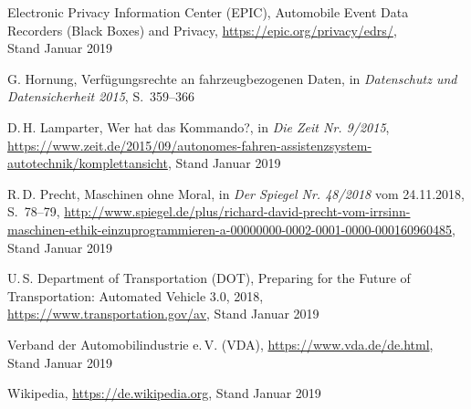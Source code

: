 \documentclass[twoside,a4paper,12pt]{article}
\begin{document}
\begin{thebibliography}{99}
 Electronic Privacy Information Center (EPIC), Automobile Event Data Recorders (Black Boxes) and Privacy,
\url{https://epic.org/privacy/edrs/}, \\Stand Januar 2019

 G. Hornung, Verfügungsrechte an fahrzeugbezogenen Daten, in \textit{Datenschutz und Datensicherheit 2015}, \mbox{S. 359--366}

 D.\,H. Lamparter, Wer hat das Kommando?, in \textit{Die Zeit Nr. 9/2015}, \\
\url{https://www.zeit.de/2015/09/autonomes-fahren-assistenzsystem-autotechnik/komplettansicht}, Stand Januar 2019

 R.\,D. Precht, Maschinen ohne Moral, in \textit{Der Spiegel Nr. 48/2018} vom 24.11.2018, \mbox{S. 78--79},
\url{http://www.spiegel.de/plus/richard-david-precht-vom-irrsinn-maschinen-ethik-einzuprogrammieren-a-00000000-0002-0001-0000-000160960485}, Stand Januar 2019

 U.\,S. Department of Transportation (DOT), Preparing for the Future of Transportation: Automated Vehicle 3.0, 2018,
\url{https://www.transportation.gov/av}, Stand Januar 2019

 Verband der Automobilindustrie e.\,V. (VDA), \url{https://www.vda.de/de.html}, Stand Januar 2019

 Wikipedia, \url{https://de.wikipedia.org}, Stand Januar 2019

\end{thebibliography}

\newpage
\end{document}
